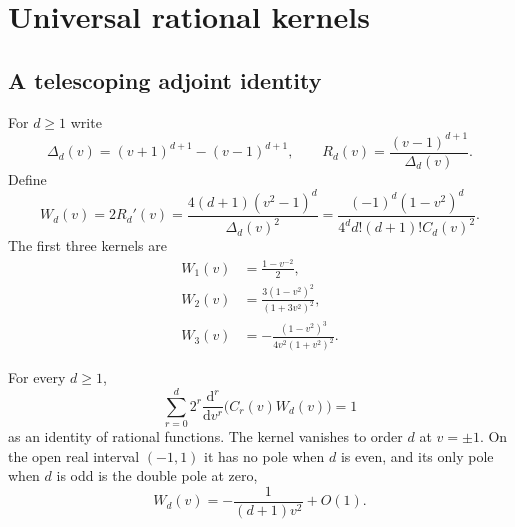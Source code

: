 \section{Universal rational kernels}
\label{sec:kernels}

\subsection{A telescoping adjoint identity}

For $d\ge1$ write
\begin{equation}\label{eq:DeltaR}
 \Delta_d(v)=(v+1)^{d+1}-(v-1)^{d+1},\qquad
 R_d(v)=\frac{(v-1)^{d+1}}{\Delta_d(v)}.
\end{equation}
Define
\begin{equation}\label{eq:Wd}
 W_d(v)=2R_d'(v)
       =\frac{4(d+1)(v^2-1)^d}{\Delta_d(v)^2}
       =\frac{(-1)^d(1-v^2)^d}{4^d d!(d+1)!C_d(v)^2}.
\end{equation}
The first three kernels are
\begin{align}
 W_1(v)&=\frac{1-v^{-2}}2,\label{eq:W1}\\
 W_2(v)&=\frac{3(1-v^2)^2}{(1+3v^2)^2},\label{eq:W2}\\
 W_3(v)&=-\frac{(1-v^2)^3}{4v^2(1+v^2)^2}.\label{eq:W3}
\end{align}

\begin{theorem}\label{thm:kernel}
For every $d\ge1$,
\begin{equation}\label{eq:adjoint}
 \sum_{r=0}^d2^r\frac{\mathrm d^r}{\mathrm dv^r}
      \bigl(C_r(v)W_d(v)\bigr)=1
\end{equation}
as an identity of rational functions. The kernel vanishes to order $d$ at $v=\pm1$. On the open real interval $(-1,1)$ it has no pole when $d$ is even, and its only pole when $d$ is odd is the double pole at zero,
\begin{equation}\label{eq:kernelpole}
 W_d(v)=-\frac1{(d+1)v^2}+O(1).
\end{equation}
\end{theorem}

